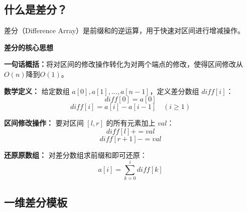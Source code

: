 \documentclass[12pt,a4paper]{article}
\begin{document}
	\subsection{什么是差分？}
	
	差分（Difference Array）是前缀和的逆运算，用于快速对区间进行增减操作。
	
	\begin{bluebox}
		\textbf{差分的核心思想}
		
		\textbf{一句话概括：}将对区间的修改操作转化为对两个端点的修改，使得区间修改从$O(n)$降到$O(1)$。
		
		\textbf{数学定义：}
		给定数组 $a[0], a[1], ..., a[n-1]$，定义差分数组 $diff[i]$：
		$$diff[0] = a[0]$$
		$$diff[i] = a[i] - a[i-1] \quad (i \geq 1)$$
		
		\textbf{区间修改操作：}
		要对区间 $[l, r]$ 的所有元素加上 $val$：
		$$diff[l] += val$$
		$$diff[r+1] -= val$$
		
		\textbf{还原原数组：}
		对差分数组求前缀和即可还原：
		$$a[i] = \sum_{k=0}^{i} diff[k]$$
	\end{bluebox}
	
	\subsection{一维差分模板}
	
\end{document}
